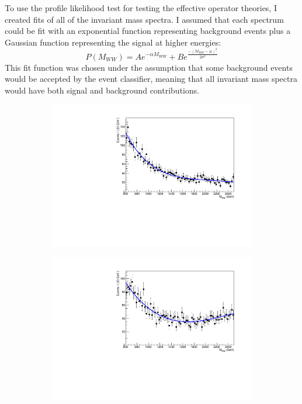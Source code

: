 \documentclass[10pt]{ucscthesisbs}
\begin{document}
To use the profile likelihood test for testing the effective operator theories, I created fits of all of the invariant mass spectra. I assumed that each spectrum could be fit with an exponential function representing background events plus a Gaussian function representing the signal at higher energies:
\begin{equation} \label{eq:mwwfit}
P(M_{WW}) = Ae^{-\alpha M_{WW}} + Be^{\frac{-(M_{WW} - \mu)^2}{2\sigma^2}}
\end{equation}
This fit function was chosen under the assumption that some background events would be accepted by the event classifier, meaning that all invariant mass spectra would have both signal and background contributions.
\begin{figure}
	\begin{subfigure}[b]{8cm}
    	\includegraphics[width=\textwidth]{images/Eff400fit}
    \end{subfigure}
    \begin{subfigure}[b]{8cm}
    	\includegraphics[width=\textwidth]{images/Eff533fit}

\end{subfigure}
\end{figure}
\end{document}
